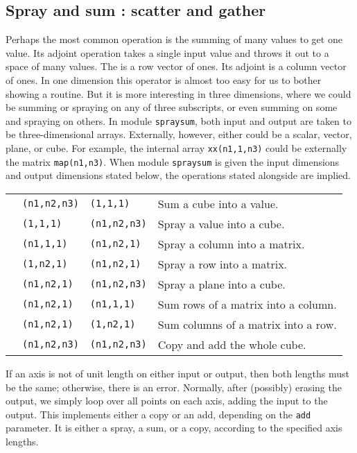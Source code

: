 \subsection{Spray and sum : scatter and gather}
Perhaps the most common operation is the summing of many values
to get one value.
Its adjoint operation takes a single input value
and throws it out to a space of many values.
The  is a row vector of ones.
Its adjoint is a column vector of ones.
In one dimension
this operator is almost too easy for us to bother showing a routine.
But it is more interesting in three dimensions,
where we could be summing or spraying on any of three subscripts,
or even summing on some and spraying on others.
In module \texttt{spraysum},
both input and output are taken
to be three-dimensional arrays.
Externally, however, either could be a scalar, vector, plane, or cube.
For example,
the internal array  {\tt xx(n1,1,n3)}
could be externally the matrix  {\tt map(n1,n3)}.
When
module \texttt{spraysum} is given
the input dimensions and output dimensions stated below,
the operations stated alongside are implied.

\begin{tabular}{p{1em}lll}
&{\tt (n1,n2,n3)}  &{\tt (1,1,1)}     &Sum a cube into a value.      \\
&{\tt (1,1,1)}     &{\tt (n1,n2,n3)}  &Spray a value into a cube.\\
&{\tt (n1,1,1)}    &{\tt (n1,n2,1)}   &Spray a column into a matrix.\\
&{\tt (1,n2,1)}    &{\tt (n1,n2,1)}   &Spray a row into a matrix.\\
&{\tt (n1,n2,1)}   &{\tt (n1,n2,n3)}  &Spray a plane into a cube.\\
&{\tt (n1,n2,1)}   &{\tt (n1,1,1)}    &Sum rows of a matrix into a column.\\
&{\tt (n1,n2,1)}   &{\tt (1,n2,1)}    &Sum columns of a matrix into a row.\\
&{\tt (n1,n2,n3)}  &{\tt (n1,n2,n3)}  &Copy and add the whole cube.
\end{tabular}

If an axis is not of unit length on either input or output,
then both lengths must be the same; otherwise, there is an error.
Normally, after (possibly) erasing the output,
we simply loop over all points on each axis, adding the input to the output.
This implements either a copy or an add, depending on the {\tt add} parameter.
It is either a spray, a sum, or a copy,
according to the specified axis lengths.

